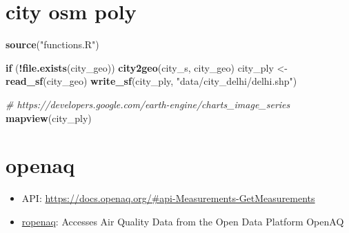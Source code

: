 \documentclass[]{book}
\newenvironment{Shaded}{\begin{snugshade}}{\end{snugshade}}
\newcommand{\CommentTok}[1]{\textcolor[rgb]{0.56,0.35,0.01}{\textit{#1}}}
\newcommand{\ControlFlowTok}[1]{\textcolor[rgb]{0.13,0.29,0.53}{\textbf{#1}}}
\newcommand{\KeywordTok}[1]{\textcolor[rgb]{0.13,0.29,0.53}{\textbf{#1}}}
\newcommand{\NormalTok}[1]{#1}
\newcommand{\OperatorTok}[1]{\textcolor[rgb]{0.81,0.36,0.00}{\textbf{#1}}}
\newcommand{\StringTok}[1]{\textcolor[rgb]{0.31,0.60,0.02}{#1}}
\begin{document}
\hypertarget{city-osm-poly}{%
\section{city osm poly}\label{city-osm-poly}}

\begin{Shaded}
\begin{Highlighting}[]
\KeywordTok{source}\NormalTok{(}\StringTok{"functions.R"}\NormalTok{)}

\ControlFlowTok{if}\NormalTok{ (}\OperatorTok{!}\KeywordTok{file.exists}\NormalTok{(city_geo))}
  \KeywordTok{city2geo}\NormalTok{(city_s, city_geo)}
\NormalTok{city_ply <-}\StringTok{ }\KeywordTok{read_sf}\NormalTok{(city_geo)}
\KeywordTok{write_sf}\NormalTok{(city_ply, }\StringTok{"data/city_delhi/delhi.shp"}\NormalTok{)}


\CommentTok{# https://developers.google.com/earth-engine/charts_image_series}
\KeywordTok{mapview}\NormalTok{(city_ply)}
\end{Highlighting}
\end{Shaded}

\hypertarget{openaq}{%
\section{openaq}\label{openaq}}

\begin{itemize}
\item
  API: \url{https://docs.openaq.org/\#api-Measurements-GetMeasurements}
\item
  \href{https://docs.ropensci.org/ropenaq/}{ropenaq}: Accesses Air Quality Data from the Open Data Platform OpenAQ
\end{itemize}
\end{document}
